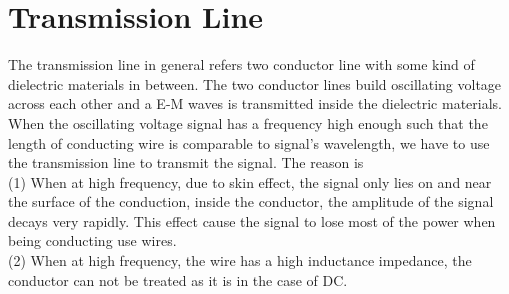 \documentclass[a4paper]{article}
\begin{document}
\section{Transmission Line}
The transmission line in general refers two conductor line with some kind of dielectric materials in between. The two conductor lines build oscillating voltage across each other and a E-M waves is transmitted inside the dielectric materials.
When the oscillating voltage signal has a frequency high enough such that the length of conducting wire is comparable to signal's wavelength, we have to use the transmission line to transmit the signal. The reason is\\
(1) When at high frequency, due to skin effect, the signal only lies on and near the surface of the conduction, inside the conductor, the amplitude of the signal decays very rapidly. This effect cause the signal to lose most of the power when being conducting use wires.\\
(2) When at high frequency, the wire has a high inductance impedance, the conductor can not be treated as it is in the case of DC.
\end{document}
